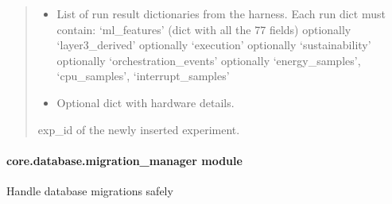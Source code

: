 \documentclass[letterpaper,10pt,english]{sphinxmanual}
\begin{document}
\begin{fulllineitems}
\begin{fulllineitems}
\begin{quote}
\begin{description}
\begin{itemize}
\item {} 
\sphinxAtStartPar
{} \textendash{} List of run result dictionaries from the harness.
Each run dict must contain:
\sphinxhyphen{} ‘ml\_features’ (dict with all the 77 fields)
\sphinxhyphen{} optionally ‘layer3\_derived’
\sphinxhyphen{} optionally ‘execution’
\sphinxhyphen{} optionally ‘sustainability’
\sphinxhyphen{} optionally ‘orchestration\_events’
\sphinxhyphen{} optionally ‘energy\_samples’, ‘cpu\_samples’, ‘interrupt\_samples’

\item {} 
\sphinxAtStartPar
{} \textendash{} Optional dict with hardware details.

\end{itemize}

\sphinxAtStartPar
exp\_id of the newly inserted experiment.

\end{description}\end{quote}

\end{fulllineitems}


\end{fulllineitems}


\sphinxstepscope


\paragraph{core.database.migration\_manager module}
\label{\detokenize{core.database.migration_manager:module-core.database.migration_manager}}\label{\detokenize{core.database.migration_manager:core-database-migration-manager-module}}\label{\detokenize{core.database.migration_manager::doc}}
\sphinxAtStartPar
Handle database migrations safely
\end{document}
